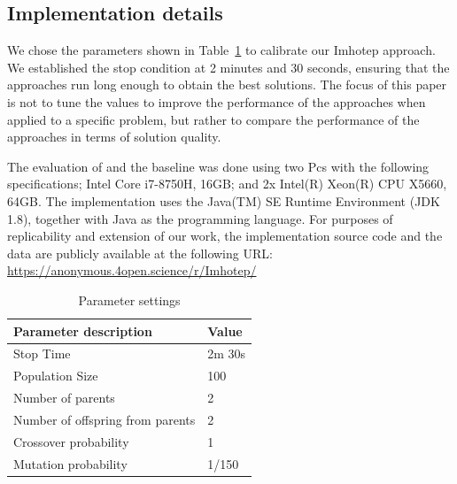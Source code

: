 \subsection{Implementation details}

We chose the parameters shown in Table~\ref{tab:evaluation_parameters} to calibrate our Imhotep approach. We established the stop condition at 2 minutes and 30 seconds, ensuring that the approaches run long enough to obtain the best solutions. The focus of this paper is not to tune the values to improve the performance of the approaches when applied to a specific problem, but rather to compare the performance of the approaches in terms of solution quality.

The evaluation of \ApproachName{} and the baseline was done
using two Pcs with the following specifications; Intel Core i7-8750H, 16GB; and  2x Intel(R) Xeon(R) CPU X5660, 64GB.
The implementation uses the Java(TM) SE Runtime Environment (JDK 1.8), together with Java as the programming language. 
For purposes of replicability and extension of our work, the implementation source code and the data are publicly available at the following URL: \url{https://anonymous.4open.science/r/Imhotep/}

\begin{table}[h]
    \centering
    \begin{tabular}{ll}
        \hline
        \bf{Parameter description}            & \bf{Value}  \\ \hline
        Stop Time                        & 2m 30s \\
        Population Size                  & 100    \\
        Number of parents                & 2      \\
        Number of offspring from parents & 2      \\
        Crossover probability            & 1      \\
        Mutation probability             & 1/150 \\ \hline
    \end{tabular}
    \caption{Parameter settings}
    \label{tab:evaluation_parameters}
    \end{table}



